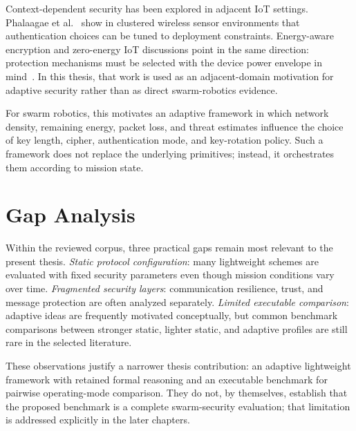 Context-dependent security has been explored in adjacent IoT settings. Phalaagae et al.~\cite{phalaagaeEnergyEfficientAuthenticationCluster2024} show in clustered wireless sensor environments that authentication choices can be tuned to deployment constraints. Energy-aware encryption and zero-energy IoT discussions point in the same direction: protection mechanisms must be selected with the device power envelope in mind~\cite{khashanSmartEnergyEfficientEncryption2024,abbasTowardsZeroenergyNavigating2024}. In this thesis, that work is used as an adjacent-domain motivation for adaptive security rather than as direct swarm-robotics evidence.

For swarm robotics, this motivates an adaptive framework in which network density, remaining energy, packet loss, and threat estimates influence the choice of key length, cipher, authentication mode, and key-rotation policy. Such a framework does not replace the underlying primitives; instead, it orchestrates them according to mission state.

\section{Gap Analysis}
\label{sec:gap_analysis}

Within the reviewed corpus, three practical gaps remain most relevant to the present thesis. \textit{Static protocol configuration}: many lightweight schemes are evaluated with fixed security parameters even though mission conditions vary over time. \textit{Fragmented security layers}: communication resilience, trust, and message protection are often analyzed separately. \textit{Limited executable comparison}: adaptive ideas are frequently motivated conceptually, but common benchmark comparisons between stronger static, lighter static, and adaptive profiles are still rare in the selected literature.

These observations justify a narrower thesis contribution: an adaptive lightweight framework with retained formal reasoning and an executable benchmark for pairwise operating-mode comparison. They do not, by themselves, establish that the proposed benchmark is a complete swarm-security evaluation; that limitation is addressed explicitly in the later chapters.
